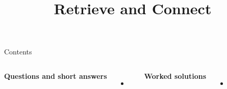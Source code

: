 \documentclass{beamer}
\title{Retrieve and Connect}
\date{}
\begin{document}
\frame{\titlepage}

\begin{frame}{Contents}
\small
\begin{columns}[T]

\textbf{Questions and short answers}
\begin{itemize}
  \item \hyperlink{q-st1}{}
\end{itemize}

\textbf{Worked solutions}
\begin{itemize}
  \item \hyperlink{work-st1}{}
\end{itemize}

\end{columns}
\end{frame}

\end{document}
